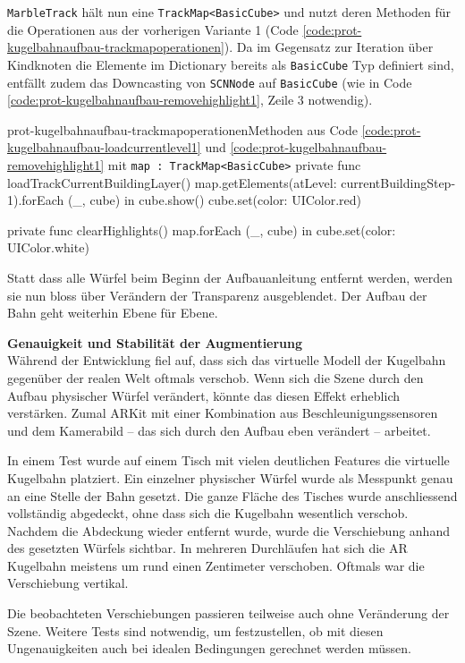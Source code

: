 \begin{description}
	\texttt{MarbleTrack} hält nun eine \texttt{TrackMap<BasicCube>} und nutzt deren Methoden für die Operationen aus der vorherigen Variante 1 (Code \ref{code:prot-kugelbahnaufbau-trackmapoperationen}). Da im Gegensatz zur Iteration über Kindknoten die Elemente im Dictionary bereits als \texttt{BasicCube} Typ definiert sind, entfällt zudem das Downcasting von \texttt{SCNNode} auf \texttt{BasicCube} (wie in Code \ref{code:prot-kugelbahnaufbau-removehighlight1}, Zeile 3 notwendig).

	\begin{code}{prot-kugelbahnaufbau-trackmapoperationen}{Methoden aus Code \ref{code:prot-kugelbahnaufbau-loadcurrentlevel1} und \ref{code:prot-kugelbahnaufbau-removehighlight1} mit \texttt{map : TrackMap<BasicCube>}}
		private func loadTrackCurrentBuildingLayer() {
			map.getElements(atLevel: currentBuildingStep-1).forEach { (_, cube) in
				cube.show()
				cube.set(color: UIColor.red)
			}
		}

		private func clearHighlights() {
			map.forEach { (_, cube) in
				cube.set(color: UIColor.white)
			}
		}
	\end{code}

	Statt dass alle Würfel beim Beginn der Aufbauanleitung entfernt werden, werden sie nun bloss über Verändern der Transparenz ausgeblendet. Der Aufbau der Bahn geht weiterhin Ebene für Ebene.

	\textbf{Genauigkeit und Stabilität der Augmentierung}\\
	Während der Entwicklung fiel auf, dass sich das virtuelle Modell der Kugelbahn gegenüber der realen Welt oftmals verschob. Wenn sich die Szene durch den Aufbau physischer Würfel verändert, könnte das diesen Effekt erheblich verstärken. Zumal ARKit mit einer Kombination aus Beschleunigungssensoren und dem Kamerabild – das sich durch den Aufbau eben verändert – arbeitet.

	In einem Test wurde auf einem Tisch mit vielen deutlichen Features die virtuelle Kugelbahn platziert. Ein einzelner physischer Würfel wurde als Messpunkt genau an eine Stelle der Bahn gesetzt. Die ganze Fläche des Tisches wurde anschliessend vollständig abgedeckt, ohne dass sich die Kugelbahn wesentlich verschob. Nachdem die Abdeckung wieder entfernt wurde, wurde die Verschiebung anhand des gesetzten Würfels sichtbar. In mehreren Durchläufen hat sich die AR Kugelbahn meistens um rund einen Zentimeter verschoben. Oftmals war die Verschiebung vertikal.

	Die beobachteten Verschiebungen passieren teilweise auch ohne Veränderung der Szene. Weitere Tests sind notwendig, um festzustellen, ob mit diesen Ungenauigkeiten auch bei idealen Bedingungen gerechnet werden müssen.



\end{description}
